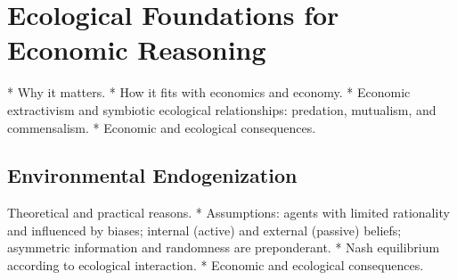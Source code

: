 \section{Ecological Foundations for Economic Reasoning}

* Why it matters. * How it fits with economics and economy. * Economic extractivism and symbiotic ecological relationships: predation, mutualism, and commensalism. * Economic and ecological consequences. 

\subsection{Environmental Endogenization}

Theoretical and practical reasons. * Assumptions: agents with limited rationality and influenced by biases; internal (active) and external (passive) beliefs; asymmetric information and randomness are preponderant. * Nash equilibrium according to ecological interaction. * Economic and ecological consequences. 

